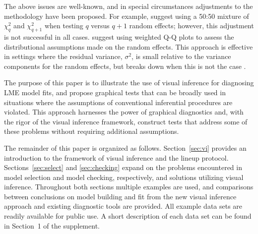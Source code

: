 \documentclass[12pt]{article}
\newcommand{\hh}[1]{{\color{orange} #1}}
\newcommand{\alnote}[1]{\todo[inline,color=green!40]{#1}} %
\newcommand{\hhnote}[1]{\todo[inline,color=orange!40]{#1}}
\begin{document}
The above issues are well-known, and in special circumstances adjustments to the methodology have been proposed. For example, \cite{Stram:1994wd} suggest using a 50:50 mixture of $\chi^2_q$ and $\chi^2_{q+1}$ when testing $q$ versus $q + 1$ random effects; however, this adjustment is not successful in all cases.  \cite{Lange:1989uu} suggest using weighted Q-Q plots to assess the distributional assumptions made on the random effects. This approach is effective in settings where the residual variance, $\sigma^2$, is small relative to the variance components for the random effects, but breaks down when this is not the case \citep{adam}.
 



The purpose of this paper is to illustrate the use of visual inference for diagnosing LME model fits, and propose graphical tests that can be broadly used in situations where the assumptions of conventional inferential procedures are violated. This approach harnesses the power of graphical diagnostics and, with the rigor of the visual inference framework, construct tests that address some of these problems without requiring additional assumptions. 


The remainder of this paper is organized as follows. 
Section~\ref{sec:vi} provides an introduction to the framework of visual inference and the lineup protocol. Sections~\ref{sec:select} and \ref{sec:checking} expand on the problems encountered in model selection and model checking, respectively, and solutions utilizing visual inference. 
Throughout both sections multiple examples are used, and comparisons between conclusions on model building and fit from the new visual inference approach and existing diagnostic tools are provided. All example data sets are readily available for public use. A short description of each data set can be found in Section~1 of the supplement.

\end{document}
